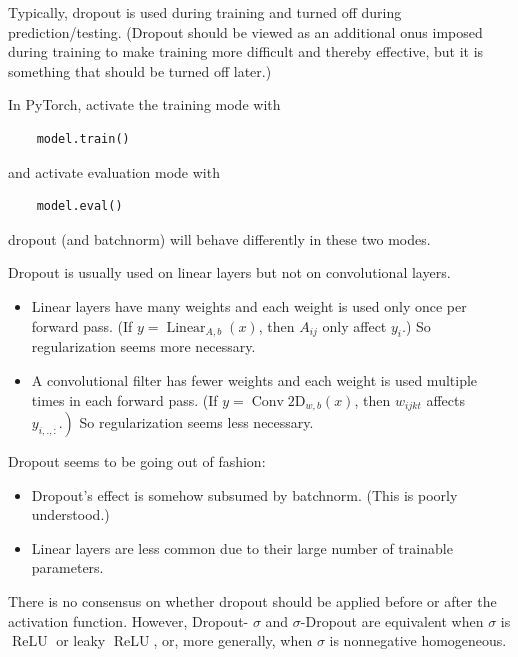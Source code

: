 \documentclass{report}
\begin{document}
\begin{concept}
    Typically, dropout is used during training and turned off during prediction/testing.
    (Dropout should be viewed as an additional onus imposed during training to make training more difficult and thereby effective, but it is something that should be turned off later.)

    In PyTorch, activate the training mode with

    \begin{verbatim}
    model.train()
    \end{verbatim}

    and activate evaluation mode with

    \begin{verbatim}
    model.eval()
    \end{verbatim}

    dropout (and batchnorm) will behave differently in these two modes.
\end{concept}

\begin{concept}
    Dropout is usually used on linear layers but not on convolutional layers.

    \begin{itemize}
        \item Linear layers have many weights and each weight is used only once per forward pass. (If $y=\operatorname{Linear}_{A, b}(x)$, then $A_{i j}$ only affect $y_{i}$.) So regularization seems more necessary.
        \item A convolutional filter has fewer weights and each weight is used multiple times in each forward pass. (If $y=\operatorname{Conv} 2 \mathrm{D}_{w, b}(x)$, then $w_{i j k t}$ affects $\left.y_{i, .,:}.\right)$ So regularization seems less necessary.
    \end{itemize}

    Dropout seems to be going out of fashion:

    \begin{itemize}
        \item Dropout's effect is somehow subsumed by batchnorm. (This is poorly understood.)
        \item Linear layers are less common due to their large number of trainable parameters.
    \end{itemize}

    There is no consensus on whether dropout should be applied before or after the activation function. However, Dropout- $\sigma$ and $\sigma$-Dropout are equivalent when $\sigma$ is $\operatorname{ReLU}$ or leaky $\operatorname{ReLU}$, or, more generally, when $\sigma$ is nonnegative homogeneous.
\end{concept}
\end{document}
